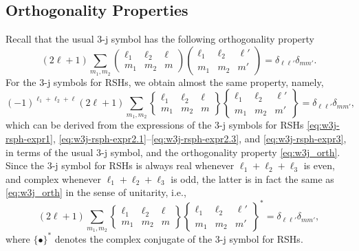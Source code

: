 \subsection{Orthogonality Properties}
\label{appdx:w3j_orth}

Recall that the usual 3-j symbol has the following orthogonality property \citep{varshalovich_quantum_1988}
\begin{equation}\label{eq:w3j_orth}
    (2\ell + 1) \sum_{m_1,m_2}
    \begin{pmatrix}
        \ell_1 & \ell_2 & \ell \\ m_1 & m_2 & m
    \end{pmatrix}
    \begin{pmatrix}
        \ell_1 & \ell_2 & \ell' \\ m_1 & m_2 & m'
    \end{pmatrix}
    =
    \delta_{\ell\ell'}
    \delta_{mm'}
    .
\end{equation}
For the 3-j symbols for RSHs, we obtain almost the same property, namely,
\begin{equation}
    (-1)^{\ell_1 + \ell_2 + \ell}
    (2\ell + 1) \sum_{m_1,m_2}
    \begin{Bmatrix}
        \ell_1 & \ell_2 & \ell \\ m_1 & m_2 & m
    \end{Bmatrix}
    \begin{Bmatrix}
        \ell_1 & \ell_2 & \ell' \\ m_1 & m_2 & m'
    \end{Bmatrix}
    =
    \delta_{\ell\ell'}
    \delta_{mm'}
    ,
\end{equation}
which can be derived from the expressions of the 3-j symbols for RSHs \eqref{eq:w3j-rsph-expr1}, \eqref{eq:w3j-rsph-expr2.1}--\eqref{eq:w3j-rsph-expr2.3}, and \eqref{eq:w3j-rsph-expr3}, in terms of the usual 3-j symbol, and the orthogonality property \eqref{eq:w3j_orth}.
Since the 3-j symbol for RSHs is always real whenever $\ell_1 + \ell_2 + \ell_3$ is even, and complex whenever $\ell_1 + \ell_2 + \ell_3$ is odd, the latter is in fact the same as \eqref{eq:w3j_orth} in the sense of unitarity, i.e.,
\begin{equation}\label{eq:w3j-rsph_orth}
    (2\ell + 1) \sum_{m_1,m_2}
    \begin{Bmatrix}
        \ell_1 & \ell_2 & \ell \\ m_1 & m_2 & m
    \end{Bmatrix}
    \begin{Bmatrix}
        \ell_1 & \ell_2 & \ell' \\ m_1 & m_2 & m'
    \end{Bmatrix}^\ast
    =
    \delta_{\ell\ell'}
    \delta_{mm'}
    ,
\end{equation}
where $\{\bullet\}^\ast$ denotes the complex conjugate of the 3-j symbol for RSHs.
